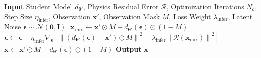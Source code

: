 \documentclass{article}
\theoremstyle{plain}
\theoremstyle{definition}
\theoremstyle{remark}
\def\vx{{\bm{x}}}
\begin{document}


\begin{algorithm}[!t]
\caption{PIDDM Inference for Forward/Inverse/Reconstruction}
\label{alg:piddm_downstream}
\begin{algorithmic}[1]
\State \textbf{Input} Student Model $d_{\boldsymbol{\theta}'}$, Physics Residual Error $\mathcal{R}$, Optimization Iterations $N_o$, Step Size $\eta_{\text{infer}}$, Observation $\vx'$, Observation Mask $M$, Loss Weight $\lambda_{\text{infer}}$, Latent Noise $\boldsymbol{\epsilon} \sim \mathcal{N}(\mathbf{0},\mathbf{I})$.
    \State $\vx_{\text{mix}} \gets \vx' \odot M + d_{\boldsymbol{\theta}'}(\boldsymbol{\epsilon}) \odot (1 - M)$
    \State $\boldsymbol{\epsilon} \gets \boldsymbol{\epsilon} - \eta_{\text{infer}} \nabla_{\boldsymbol{\epsilon}}[\left\| (d_{\boldsymbol{\theta}'}(\boldsymbol{\epsilon}) - \vx') \odot M \right\|^2 + \lambda_{\text{infer}} \left\| \mathcal{R}(\vx_{\text{mix}}) \right\|^2]$
\EndFor
\State $\vx \gets \vx' \odot M + d_{\boldsymbol{\theta}'}(\boldsymbol{\epsilon}) \odot (1 - M)$
\State \textbf{Output} $\vx$
\end{algorithmic}
\end{algorithm}
\end{document}
